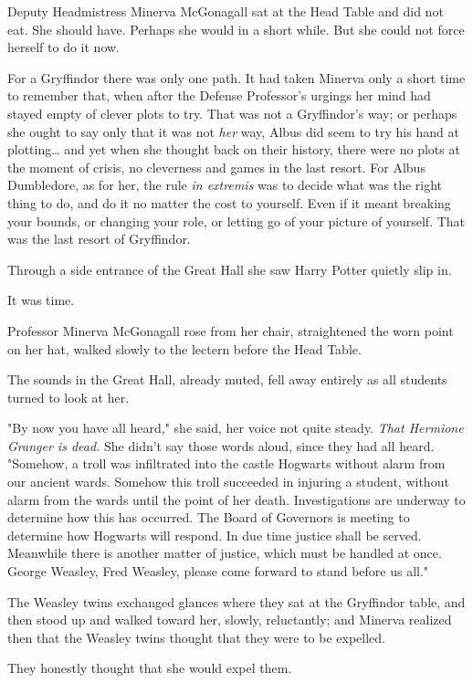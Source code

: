 Deputy Headmistress Minerva McGonagall sat at the Head Table and did not eat. 
She should have. Perhaps she would in a short while. But she could not force 
herself to do it now.

For a Gryffindor there was only one path. It had taken Minerva only a short 
time to remember that, when after the Defense Professor's urgings her mind had 
stayed empty of clever plots to try. That was not a Gryffindor's way; or 
perhaps she ought to say only that it was not \emph{her} way, Albus did seem to 
try his hand at plotting{\ldots} and yet when she thought back on their 
history, there were no plots at the moment of crisis, no cleverness and games 
in the last resort. For Albus Dumbledore, as for her, the rule \emph{in 
extremis} was to decide what was the right thing to do, and do it no matter the 
cost to yourself. Even if it meant breaking your bounds, or changing your role, 
or letting go of your picture of yourself. That was the last resort of 
Gryffindor.

Through a side entrance of the Great Hall she saw Harry Potter quietly slip in.

It was time.

Professor Minerva McGonagall rose from her chair, straightened the worn point 
on her hat, walked slowly to the lectern before the Head Table.

The sounds in the Great Hall, already muted, fell away entirely as all students 
turned to look at her.

"By now you have all heard," she said, her voice not quite steady. \emph{That 
Hermione Granger is dead.} She didn't say those words aloud, since they had all 
heard. "Somehow, a troll was infiltrated into the castle Hogwarts without alarm 
from our ancient wards. Somehow this troll succeeded in injuring a student, 
without alarm from the wards until the point of her death. Investigations are 
underway to determine how this has occurred. The Board of Governors is meeting 
to determine how Hogwarts will respond. In due time justice shall be served. 
Meanwhile there is another matter of justice, which must be handled at once. 
George Weasley, Fred Weasley, please come forward to stand before us all."

The Weasley twins exchanged glances where they sat at the Gryffindor table, and 
then stood up and walked toward her, slowly, reluctantly; and Minerva realized 
then that the Weasley twins thought that they were to be expelled.

They honestly thought that she would expel them.

